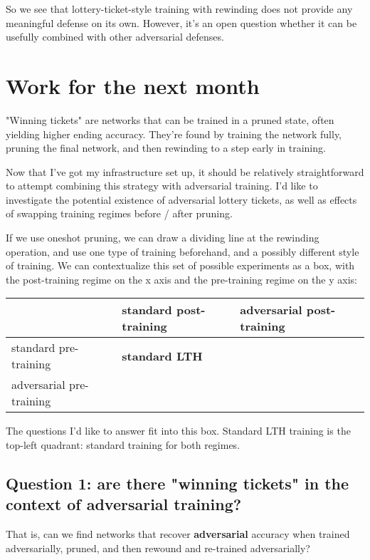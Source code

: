\documentclass[11pt]{article}
\begin{document}
So we see that lottery-ticket-style training with rewinding does not provide any meaningful defense on its own.
However, it's an open question whether it can be usefully combined with other adversarial defenses.

\section{Work for the next month}
\label{sec:org7c08006}

"Winning tickets" are networks that can be trained in a pruned state, often yielding higher
ending accuracy. They're found by training the network fully, pruning the final network,
and then rewinding to a step early in training.

Now that I've got my infrastructure set up, it should be relatively straightforward to
attempt combining this strategy with adversarial training. I'd like to investigate the
potential existence of adversarial lottery tickets,
as well as effects of swapping training regimes before / after pruning.

If we use oneshot pruning, we can draw a dividing line at the rewinding operation, and use one type of training
beforehand, and a possibly different style of training. We can contextualize this set of possible experiments as a box, with the post-training regime on the x
axis and the pre-training regime on the y axis:

\begin{center}
\begin{tabular}{lll}
 & standard post-training & adversarial post-training\\
\hline
standard pre-training & \textbf{standard LTH} & \\
adversarial pre-training &  & \\
\end{tabular}
\end{center}

The questions I'd like to answer fit into this box. Standard LTH training is the top-left quadrant: standard
training for both regimes.

\subsection{Question 1: are there "winning tickets" in the context of adversarial training?}
\label{sec:org839be2e}

That is, can we find networks that recover \textbf{adversarial} accuracy when trained
adversarially, pruned,
and then rewound and re-trained adversarially?
\end{document}
